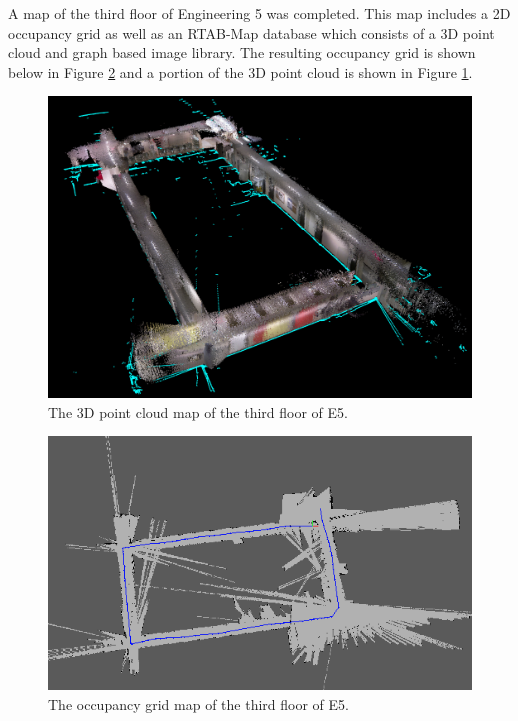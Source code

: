 \documentclass[letterpaper, 10 pt, conference]{ieeeconf}  %
\begin{document}
A map of the third floor of Engineering 5 was completed. This map includes a 2D occupancy grid as well as an RTAB-Map database which consists of a 3D point cloud and graph based image library. The resulting occupancy grid is shown below in Figure \ref{third_occ_grid} and a portion of the 3D point cloud is shown in Figure \ref{third_point_cloud}.

	\begin{figure}[!ht]
		\centering
		\includegraphics[width=1.0\columnwidth]{Figures/3rdfloor_point_cloud}
		\caption{The 3D point cloud map of the third floor of E5.}
		\label{third_point_cloud}
	\end{figure}
	
	\begin{figure}[!ht]
		\centering
		\includegraphics[width=1.0\columnwidth]{Figures/3rd_occupancy_grid}
		\caption{The occupancy grid map of the third floor of E5.}
		\label{third_occ_grid}
	\end{figure}
	
\end{document}
